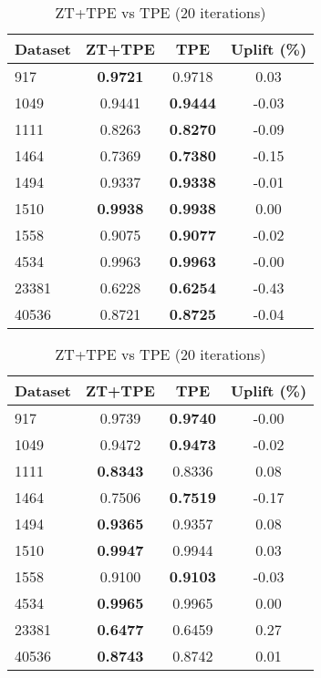 \begin{table}[htbp]
\begin{center}
\begin{small}
\begin{sc}
\begin{subtable}[t]{0.48\textwidth}
    \centering
    \caption{ZT+TPE vs TPE (10 iterations)}
    \label{tab:xgboost-optuna-10}
    \begin{tabular}{lccc}
    \toprule
    \textbf{Dataset} & \textbf{ZT+TPE} & \textbf{TPE} & \textbf{Uplift (\%)} \\
    \midrule
    917    & \textbf{0.9721} & 0.9718 & 0.03 \\
    1049    & 0.9441 & \textbf{0.9444} & -0.03 \\
    1111    & 0.8263 & \textbf{0.8270} & -0.09 \\
    1464    & 0.7369 & \textbf{0.7380} & -0.15 \\
    1494    & 0.9337 & \textbf{0.9338} & -0.01 \\
    1510    & \textbf{0.9938} & \textbf{0.9938} & 0.00 \\
    1558    & 0.9075 & \textbf{0.9077} & -0.02 \\
    4534    & 0.9963 & \textbf{0.9963} & -0.00 \\
    23381    & 0.6228 & \textbf{0.6254} & -0.43 \\
    40536    & 0.8721 & \textbf{0.8725} & -0.04 \\
    \bottomrule
    \end{tabular}
\end{subtable}
\hfill
\begin{subtable}[t]{0.48\textwidth}
    \centering
    \caption{ZT+TPE vs TPE (20 iterations)}
    \label{tab:xgboost-optuna-20}
    \begin{tabular}{lccc}
    \toprule
    \textbf{Dataset} & \textbf{ZT+TPE} & \textbf{TPE} & \textbf{Uplift (\%)} \\
    \midrule
    917    & 0.9739 & \textbf{0.9740} & -0.00 \\
    1049    & 0.9472 & \textbf{0.9473} & -0.02 \\
    1111    & \textbf{0.8343} & 0.8336 & 0.08 \\
    1464    & 0.7506 & \textbf{0.7519} & -0.17 \\
    1494    & \textbf{0.9365} & 0.9357 & 0.08 \\
    1510    & \textbf{0.9947} & 0.9944 & 0.03 \\
    1558    & 0.9100 & \textbf{0.9103} & -0.03 \\
    4534    & \textbf{0.9965} & 0.9965 & 0.00 \\
    23381    & \textbf{0.6477} & 0.6459 & 0.27 \\
    40536    & \textbf{0.8743} & 0.8742 & 0.01 \\
    \bottomrule
    \end{tabular}
\end{subtable}

\end{sc}
\end{small}
\end{center}
\vskip -0.1in
\end{table}